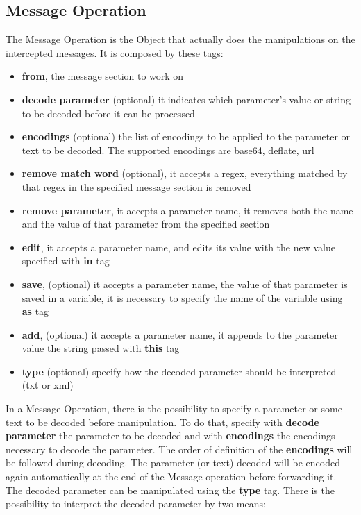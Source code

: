 \subsection{Message Operation}
The Message Operation is the Object that actually does the manipulations on the intercepted messages. It is composed by these tags:
\begin{itemize}
    \item \textbf{from}, the message section to work on
    \item \textbf{decode parameter} (optional) it indicates which parameter's value or string to be decoded before it can be processed
    \item \textbf{encodings} (optional) the list of encodings to be applied to the parameter or text to be decoded. The supported encodings are base64, deflate, url
    \item \textbf{remove match word} (optional), it accepts a regex, everything matched by that regex in the specified message section is removed
    \item \textbf{remove parameter}, it accepts a parameter name, it removes both the name and the value of that parameter from the specified section
    \item \textbf{edit}, it accepts a parameter name, and edits its value with the new value specified with \textbf{in} tag
    \item \textbf{save}, (optional) it accepts a parameter name, the value of that parameter is saved in a variable, it is necessary to specify the name of the variable using \textbf{as} tag
    \item \textbf{add}, (optional) it accepts a parameter name, it appends to the parameter value the string passed with \textbf{this} tag
    \item \textbf{type} (optional) specify how the decoded parameter should be interpreted (txt or xml)
\end{itemize}

In a Message Operation, there is the possibility to specify a parameter or some text to be decoded before manipulation. To do that, specify with \textbf{decode parameter} the parameter to be decoded and with \textbf{encodings} the encodings necessary to decode the parameter. The order of definition of the \textbf{encodings} will be followed during decoding. The parameter (or text) decoded will be encoded again automatically at the end of the Message operation before forwarding it.
The decoded parameter can be manipulated using the \textbf{type} tag. There is the possibility to interpret the decoded parameter by two means: 

